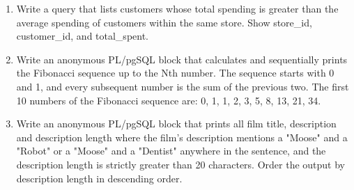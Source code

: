 \documentclass[12pt,a4paper]{article}
\newif\ifshowsolutions
\begin{document}
\begin{enumerate}
\item Write a query that lists customers whose total spending
is greater than the average spending of customers
within the same store.
Show store\_id, customer\_id, and total\_spent.

\ifshowsolutions
\begin{lstlisting}[language=SQL]
SELECT c.store_id,
       c.customer_id,
       SUM(p.amount) AS total_spent
FROM customer c
JOIN payment p ON p.customer_id = c.customer_id
GROUP BY c.store_id, c.customer_id
HAVING SUM(p.amount) >
       (
           SELECT AVG(store_total)
           FROM (
               SELECT SUM(p2.amount) AS store_total
               FROM customer c2
               JOIN payment p2 ON p2.customer_id = c2.customer_id
               WHERE c2.store_id = c.store_id
               GROUP BY c2.customer_id
           ) sub
       )
ORDER BY c.store_id, total_spent DESC;
\end{lstlisting}
\fi
\item Write an anonymous PL/pgSQL block that calculates and sequentially prints the Fibonacci sequence up to the Nth number. The sequence starts with 0 and 1, and every subsequent number is the sum of the previous two. The first 10 numbers of the Fibonacci sequence are: 0, 1, 1, 2, 3, 5, 8, 13, 21, 34. 
\ifshowsolutions
\begin{lstlisting}[language=SQL]
DO $$
DECLARE
    n INT := 10;
    a INT := 0;
    b INT := 1;
    temp INT;
BEGIN
    RAISE NOTICE 'Printing the first % Fibonacci numbers:', n;
    
    FOR i IN 1..n LOOP
        RAISE NOTICE '%', a;
        
        -- Calculate the next number in the sequence
        temp := a + b;
        
        -- Shift the values forward for the next iteration
        a := b;
        b := temp;
    END LOOP;
END $$;
\end{lstlisting}
\fi
\item Write an anonymous PL/pgSQL block that prints all film title, description and description length where the film's description mentions a "Moose" and a "Robot" or a "Moose" and a "Dentist" anywhere in the sentence, and the description length is strictly greater than 20 characters. Order the output by description length in descending order.


\end{enumerate}
\end{document}
